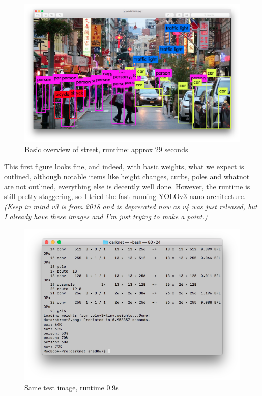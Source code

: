 \documentclass{article}
\begin{document}
\begin{figure}[htbp]
    \centerline{\includegraphics[scale=0.3]{Images/PredS1.png}}
    \caption{Basic overview of street, runtime: approx 29 seconds}
    \label{fig3}
\end{figure}

This first figure looks fine, and indeed, with basic weights, what we expect is outlined, although notable items like height changes, curbs, poles and whatnot are not outlined, everything else is decently well done. However, the runtime is still pretty staggering, so I tried the fast running YOLOv3-nano architecture. \textit{(Keep in mind v3 is from 2018 and is deprecated now as v4 was just released, but I already have these images and I'm just trying to make a point.)}

\begin{figure}[htbp]
    \centerline{\includegraphics[scale=0.5]{Images/Term2.png}}
    \caption{Same test image, runtime 0.9s}
    \label{fig4}
\end{figure}
\end{document}
